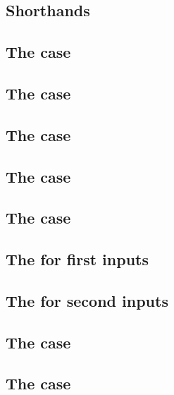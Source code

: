 \subsection{Shorthands                                  }    \label{bls: specialized: shorthands}                 %
\subsection{The \instPointEvaluation{} case           }    \label{bls: specialized: pointevaluation}            %
\subsection{The \instBlsGOneAdd{} case                       }    \label{bls: specialized: g1add}                      %
\subsection{The \instBlsGOneMsm{} case                       }    \label{bls: specialized: g1msm}                      %
\subsection{The \instBlsGTwoAdd{} case                       }    \label{bls: specialized: g2add}                      %
\subsection{The \instBlsGTwoMsm{} case                       }    \label{bls: specialized: g2msm}                      %
\subsection{The \instBlsPairingCheck{} for first inputs  }    \label{bls: specialized: pairingcheck first}         %
\subsection{The \instBlsPairingCheck{} for second inputs }    \label{bls: specialized: pairingcheck second}        %
\subsection{The \instBlsMapFpToGOne{} case             }    \label{bls: specialized: fptog1}                     %
\subsection{The \instBlsMapFpTwoToGTwo{} case            }    \label{bls: specialized: fp2tog2}                    %
